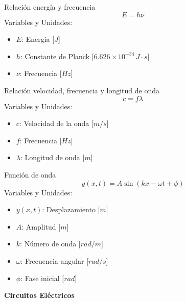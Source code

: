 \documentclass{article}
\begin{document}
\begin{multicols}{3}

\begin{teorema}{Relación energía y frecuencia}
    $$E = h \nu$$
    Variables y Unidades:
    \begin{itemize}
        \item $E$: Energía [$J$]
        \item $h$: Constante de Planck [$6.626 \times 10^{-34} \, J \cdot s$]
        \item $\nu$: Frecuencia [$Hz$]
    \end{itemize}
\end{teorema}

\begin{teorema}{Relación velocidad, frecuencia y longitud de onda}
    $$c = f \lambda$$
    Variables y Unidades:
    \begin{itemize}
        \item $c$: Velocidad de la onda [$m/s$]
        \item $f$: Frecuencia [$Hz$]
        \item $\lambda$: Longitud de onda [$m$]
    \end{itemize}
\end{teorema}

\begin{teorema}{Función de onda}
    $$y(x,t) = A \sin(kx - \omega t + \phi)$$
    Variables y Unidades:
    \begin{itemize}
        \item $y(x,t)$: Desplazamiento [$m$]
        \item $A$: Amplitud [$m$]
        \item $k$: Número de onda [$rad/m$]
        \item $\omega$: Frecuencia angular [$rad/s$]
        \item $\phi$: Fase inicial [$rad$]
    \end{itemize}
\end{teorema}

\end{multicols}

\newpage

\begin{center}
    \LARGE \textbf{Circuitos Eléctricos}
\end{center}
\end{document}
